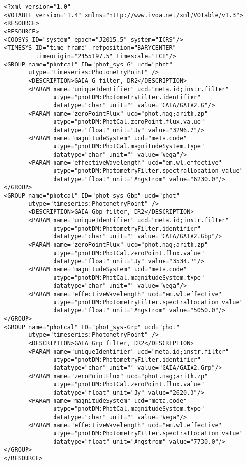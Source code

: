 \noindent
\begingroup\footnotesize
\begin{tcolorbox}
\begin{verbatim}
<?xml version="1.0" 
<VOTABLE version="1.4" xmlns="http://www.ivoa.net/xml/VOTable/v1.3">
<RESOURCE>
<RESOURCE>
<COOSYS ID="system" epoch="J2015.5" system="ICRS"/>
<TIMESYS ID="time_frame" refposition="BARYCENTER" 
         timeorigin="2455197.5" timescale="TCB"/>
<GROUP name="photcal" ID="phot_sys-G" ucd="phot" 
       utype="timeseries:PhotometryPoint" /> 
       <DESCRIPTION>GAIA G filter, DR2</DESCRIPTION>
       <PARAM name="uniqueIdentifier" ucd="meta.id;instr.filter" 
              utype="photDM:PhotometryFilter.identifier" 
              datatype="char" unit="" value="GAIA/GAIA2.G"/>
       <PARAM name="zeroPointFlux" ucd="phot.mag;arith.zp" 
              utype="photDM:PhotCal.zeroPoint.flux.value" 
              datatype="float" unit="Jy" value="3296.2"/>
       <PARAM name="magnitudeSystem" ucd="meta.code" 
              utype="photDM:PhotCal.magnitudeSystem.type" 
              datatype="char" unit="" value="Vega"/>
       <PARAM name="effectiveWavelength" ucd="em.wl.effective" 
              utype="photDM:PhotometryFilter.spectralLocation.value" 
              datatype="float" unit="Angstrom" value="6230.0"/>
</GROUP>
<GROUP name="photcal" ID="phot_sys-Gbp" ucd="phot" 
       utype="timeseries:PhotometryPoint" /> 
       <DESCRIPTION>GAIA Gbp filter, DR2</DESCRIPTION>
       <PARAM name="uniqueIdentifier" ucd="meta.id;instr.filter" 
              utype="photDM:PhotometryFilter.identifier" 
              datatype="char" unit="" value="GAIA/GAIA2.Gbp"/>
       <PARAM name="zeroPointFlux" ucd="phot.mag;arith.zp" 
              utype="photDM:PhotCal.zeroPoint.flux.value" 
              datatype="float" unit="Jy" value="3534.7"/>
       <PARAM name="magnitudeSystem" ucd="meta.code" 
              utype="photDM:PhotCal.magnitudeSystem.type" 
              datatype="char" unit="" value="Vega"/>
       <PARAM name="effectiveWavelength" ucd="em.wl.effective" 
              utype="photDM:PhotometryFilter.spectralLocation.value" 
              datatype="float" unit="Angstrom" value="5050.0"/>
</GROUP>
<GROUP name="photcal" ID="phot_sys-Grp" ucd="phot" 
       utype="timeseries:PhotometryPoint" /> 
       <DESCRIPTION>GAIA Grp filter, DR2</DESCRIPTION>
       <PARAM name="uniqueIdentifier" ucd="meta.id;instr.filter" 
              utype="photDM:PhotometryFilter.identifier" 
              datatype="char" unit="" value="GAIA/GAIA2.Grp"/>
       <PARAM name="zeroPointFlux" ucd="phot.mag;arith.zp" 
              utype="photDM:PhotCal.zeroPoint.flux.value" 
              datatype="float" unit="Jy" value="2620.3"/>
       <PARAM name="magnitudeSystem" ucd="meta.code" 
              utype="photDM:PhotCal.magnitudeSystem.type" 
              datatype="char" unit="" value="Vega"/>
       <PARAM name="effectiveWavelength" ucd="em.wl.effective" 
              utype="photDM:PhotometryFilter.spectralLocation.value" 
              datatype="float" unit="Angstrom" value="7730.0"/>
</GROUP>
</RESOURCE>

\end{verbatim}
\end{tcolorbox}
\endgroup

